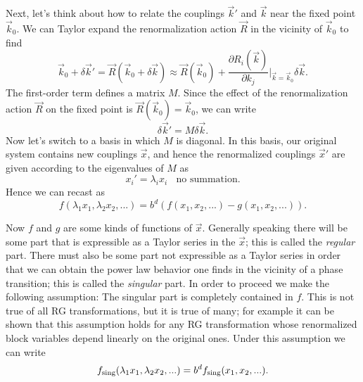 Next, let's think about how to relate the couplings $\vec{k}'$ and $\vec{k}$
near the fixed point $\vec{k}_0$. 
We can Taylor expand the renormalization action $\vec{R}$ in the vicinity of $\vec{k}_0$ to find
\begin{equation}
  \vec{k}_0+\delta\vec{k}'=\vec{R}\left(\vec{k}_0+\delta\vec{k}\right)
                          \approx\vec{R}(\vec{k}_0)
                           +\frac{\partial R_i(\vec{k})}{\partial k_j}
                              \Big|_{\vec{k}=\vec{k}_0}\delta\vec{k}.
\end{equation}
The first-order term defines a matrix $M$.
Since the effect of the renormalization action
$\vec{R}$ on the fixed point is $\vec{R}(\vec{k}_0)=\vec{k}_0$, we can write
\begin{equation}
  \delta\vec{k}'=M\delta\vec{k}.
\end{equation}
Now let's switch to a basis in which $M$ is diagonal. In this basis, our
original system contains new couplings $\vec{x}$, and hence the renormalized
couplings $\vec{x}'$ are given according to the eigenvalues of $M$ as
\begin{equation}
  x_i'=\lambda_i x_i~~~~\text{no summation}.
\end{equation}
Hence we can recast  as
\begin{equation}\label{eq:widom2}
f(\lambda_1x_1,\lambda_2x_2,...)=b^d\left(f(x_1,x_2,...)-g(x_1,x_2,...)\right).
\end{equation}


Now $f$ and $g$ are some kinds of functions of $\vec{x}$. Generally speaking
there will be some part that is expressible as a Taylor series in the $\vec{x}$;
this is called the {\it regular} part. There must also be some
part not expressible as a Taylor series in order that we can obtain the power
law behavior one finds in the vicinity of a phase transition; this is
called the {\it singular} part. In order to proceed we make
the following assumption: The singular part is completely contained in
$f$. This is not true of all RG transformations, but it is true
of many; for example it can be shown that this assumption holds for any
RG transformation whose renormalized block variables depend linearly
on the original ones. Under this assumption we can write
\begin{equation}\label{eq:widom2}
  f_{\text{sing}}(\lambda_1x_1,\lambda_2x_2,...)=b^df_{\text{sing}}(x_1,x_2,...).
\end{equation}


